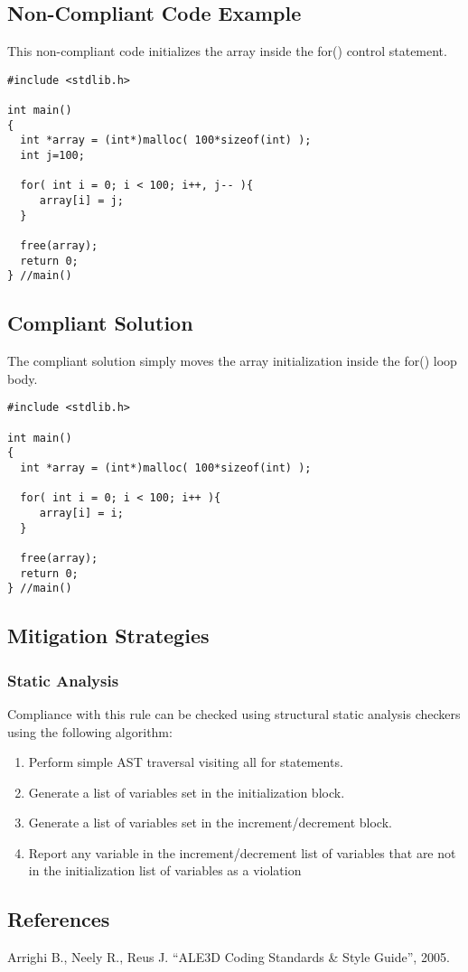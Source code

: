 \subsection{Non-Compliant Code Example}
This non-compliant code initializes the array inside the for() control statement.

\begin{verbatim}
#include <stdlib.h>

int main()
{
  int *array = (int*)malloc( 100*sizeof(int) );
  int j=100;

  for( int i = 0; i < 100; i++, j-- ){
     array[i] = j;
  }

  free(array);
  return 0;
} //main()
\end{verbatim}

\subsection{Compliant Solution}
The compliant solution simply moves the array initialization inside the for() loop body.

\begin{verbatim}
#include <stdlib.h>

int main()
{
  int *array = (int*)malloc( 100*sizeof(int) );

  for( int i = 0; i < 100; i++ ){
     array[i] = i;
  }

  free(array);
  return 0;
} //main()
\end{verbatim}

\subsection{Mitigation Strategies}
\subsubsection{Static Analysis} 

Compliance with this rule can be checked using structural static analysis checkers using the following algorithm:

\begin{enumerate}
\item Perform simple AST traversal visiting all for statements.
\item Generate a list of variables set in the initialization block.
\item Generate a list of variables set in the increment/decrement block.
\item Report any variable in the increment/decrement list of variables that are not in the initialization list of variables as a violation
\end{enumerate}

\subsection{References}

Arrighi B., Neely R., Reus J. ``ALE3D Coding Standards \& Style Guide'', 2005.
